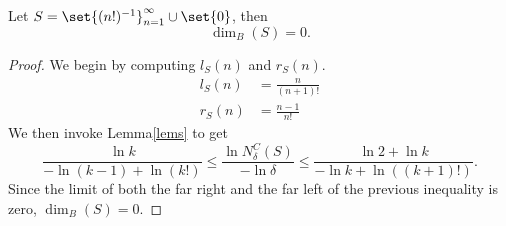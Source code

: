 \begin{example}
	Let $S=\set{(n!)^{-1}}_{n=1}^\infty\cup\set{0}$, then
	\[
		\dim_B(S)=0.
	\]
\end{example}
\begin{proof}
	We begin by computing $l_S(n)$ and $r_S(n)$.
	\begin{align*}
		l_S(n) &= \frac{n}{(n+1)!}\\
		r_S(n) &= \frac{n-1}{n!}
	\end{align*}
	We then invoke Lemma\autoref{lems} to get
	\[
		\frac{\ln k}{-\ln (k-1)+\ln(k!)} \leq \frac{\ln N^C_\delta(S)}{-\ln\delta} \leq \frac{\ln 2+\ln k}{-\ln k +\ln ((k+1)!)}.
	\]
	Since the limit of both the far right and the far left of the previous inequality is zero, $\dim_B(S)=0$.
\end{proof}

